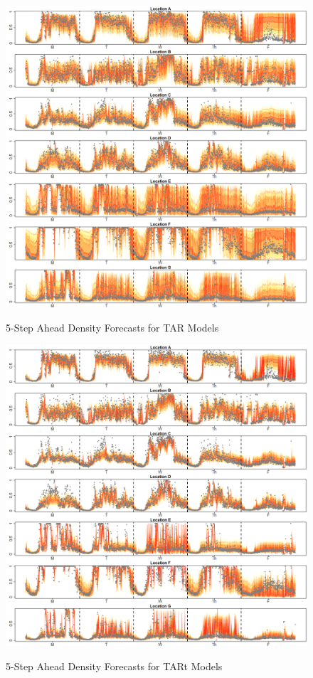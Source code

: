 \begin{figure}[htbp]
\caption{5-Step Ahead Density Forecasts for TAR Models}
\includegraphics[width=\textwidth]{DENS5Plots}
\label{fig:DENS3Plots}
\end{figure}

\begin{figure}[htbp]
\caption{5-Step Ahead Density Forecasts for TARt Models}
\includegraphics[width=\textwidth]{DENS5tPlots}
\label{fig:DENS3tPlots}
\end{figure}

















